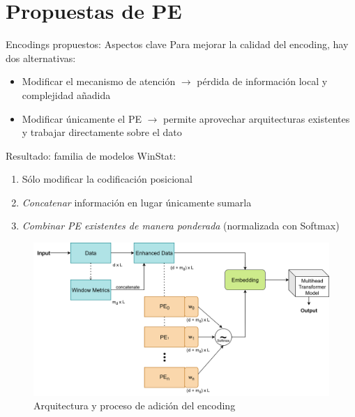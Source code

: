 \documentclass[compress]{beamer}
\begin{document}
	\section{Propuestas de PE}
	\begin{frame}{Encodings propuestos: Aspectos clave}
		Para mejorar la calidad del encoding, hay dos alternativas:
		\begin{itemize}
			\item Modificar el mecanismo de atención $\rightarrow$ pérdida de información local y complejidad añadida
			\item Modificar únicamente el PE $\rightarrow$ permite aprovechar arquitecturas existentes y trabajar directamente sobre el dato
		\end{itemize}
		
		Resultado: familia de modelos WinStat:
		\begin{enumerate}
			\item Sólo modificar la codificación posicional
			\item \emph{Concatenar} información en lugar únicamente sumarla
			\item \emph{Combinar PE existentes de manera ponderada} (normalizada con Softmax)
			
			 \end{enumerate}
	\end{frame}
	
	
	\begin{frame}
		\begin{figure}
			\includegraphics[width=\linewidth]{pic/enhancedhybrid.png}
			\caption{Arquitectura y proceso de adición del encoding}
		\end{figure}
		
	\end{frame}
	
\end{document}
